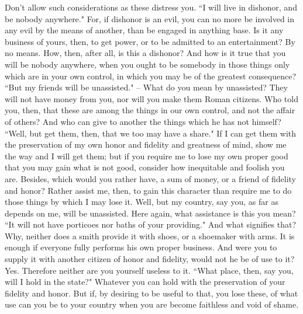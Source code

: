 \documentclass[12pt]{article}
\begin{document}
Don't allow such considerations as these distress you. ``I will
live in dishonor, and be nobody anywhere." For, if dishonor is an
evil, you can no more be involved in any evil by the means of another,
than be engaged in anything base. Is it any business of yours, then,
to get power, or to be admitted to an entertainment? By no means.
How, then, after all, is this a dishonor? And how is it true that
you will be nobody anywhere, when you ought to be somebody in those
things only which are in your own control, in which you may be of
the greatest consequence? ``But my friends will be unassisted." --
What do you mean by unassisted? They will not have money from you,
nor will you make them Roman citizens. Who told you, then, that these
are among the things in our own control, and not the affair of others?
And who can give to another the things which he has not himself? ``Well,
but get them, then, that we too may have a share." If I can get them
with the preservation of my own honor and fidelity and greatness of
mind, show me the way and I will get them; but if you require me to
lose my own proper good that you may gain what is not good, consider
how inequitable and foolish you are. Besides, which would you rather
have, a sum of money, or a friend of fidelity and honor? Rather assist
me, then, to gain this character than require me to do those things
by which I may lose it. Well, but my country, say you, as far as depends
on me, will be unassisted. Here again, what assistance is this you
mean? ``It will not have porticoes nor baths of your providing." And
what signifies that? Why, neither does a smith provide it with shoes,
or a shoemaker with arms. It is enough if everyone fully performs
his own proper business. And were you to supply it with another citizen
of honor and fidelity, would not he be of use to it? Yes. Therefore
neither are you yourself useless to it. ``What place, then, say you,
will I hold in the state?" Whatever you can hold with the preservation
of your fidelity and honor. But if, by desiring to be useful to that,
you lose these, of what use can you be to your country when you are
become faithless and void of shame. 

\section{}
\end{document}

